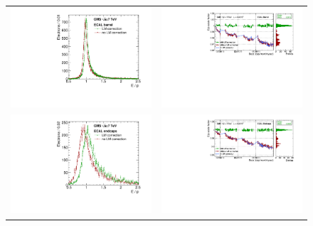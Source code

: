 \begin{figure}
\begin{center}
\begin{tabular}{cc}
 \hspace{-0.5cm}
 \includegraphics[width=0.40\linewidth]{figs/cms/EoP_TypicalFit_EB.pdf} &
 \hspace{-1cm}
 \includegraphics[width=0.69\linewidth]{figs/cms/EsuPhistoryEB.pdf} \\
 \hspace{-0.5cm}
 \includegraphics[width=0.40\linewidth]{figs/cms/EoP_TypicalFit_EE.pdf} &
 \hspace{-1cm}
 \includegraphics[width=0.69\linewidth]{figs/cms/EsuPhistoryEE_alpha116.pdf}

\end{tabular}
\end{center}
\end{figure}
